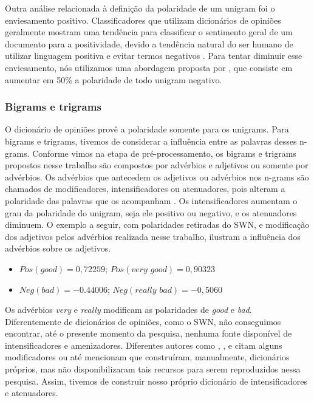 \documentclass[template.tex]{subfiles}
\begin{document}
Outra análise relacionada à definição da polaridade de um unigram foi o enviesamento positivo. Classificadores que utilizam dicionários de opiniões geralmente mostram uma tendência para classificar o sentimento geral de um documento para a positividade, devido a tendência natural do ser humano de utilizar linguagem positiva e evitar termos negativos \cite{boucher1969pollyanna, kennedy2006sentiment}. Para tentar diminuir esse enviesamento, nós utilizamos uma abordagem proposta por , que consiste em aumentar em 50\% a polaridade de todo unigram negativo. 

\subsubsection{Bigrams e trigrams}

O dicionário de opiniões provê a polaridade somente para os unigrams. Para bigrams e trigrams, tivemos de considerar a influência entre as palavras desses n-grams. Conforme vimos na etapa de pré-processamento, os bigrams e trigrams propostos nesse trabalho são compostos por advérbios e adjetivos ou somente por advérbios. Os advérbios que antecedem os adjetivos ou advérbios nos n-grams são chamados de modificadores, intensificadores ou atenuadores, pois alteram a polaridade das palavras que os acompanham \cite{voll2007not}. Os intensificadores aumentam o grau da polaridade do unigram, seja ele positivo ou negativo, e os atenuadores diminuem. O exemplo a seguir, com polaridades retiradas do SWN, e modificação dos adjetivos pelos advérbios realizada nesse trabalho, ilustram a influência dos advérbios sobre os adjetivos.  


\begin{itemize}
\item \label{itm:very_exem} $Pos(\textit{good}) = 0,72259$; $Pos(\textit{very good}) = 0,90323$
\item \label{itm:really_exem} $Neg(\textit{bad}) = -0.44006$; $Neg(\textit{really bad}) = -0,5060$
\end{itemize}

Os advérbios \textit{very} e \textit{really} modificam as polaridades de \textit{good} e \textit{bad}. Diferentemente de dicionários de opiniões, como o SWN, não conseguimos encontrar, até o presente momento da pesquisa, nenhuma fonte disponível de intensificadores e amenizadores. Diferentes autores como , ,  e  citam alguns modificadores ou até mencionam que construíram, manualmente, dicionários próprios, mas não disponibilizaram tais recursos para serem reproduzidos nessa pesquisa. Assim, tivemos de construir nosso próprio dicionário de intensificadores e atenuadores. 
\end{document}
